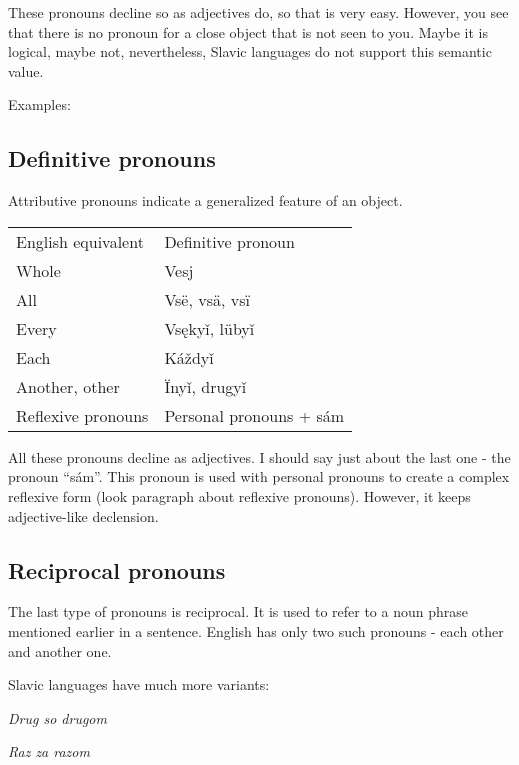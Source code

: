 These pronouns decline so as adjectives do, so that is very easy. However, you see that there is no pronoun for a close object that is not seen to you. Maybe it is logical, maybe not, nevertheless, Slavic languages do not support this semantic value.

Examples:

\subsection{Definitive pronouns}

Attributive pronouns indicate a generalized feature of an object. 

\begin{table}
	\begin{tabular}{ll}
		English equivalent & Definitive pronoun \\
		Whole & Vesj \\
		All & Vsë, vsä, vsï \\
		Every & Vsękyǐ, lübyǐ \\
		Each & Káždyǐ \\
		Another, other & Ïnyǐ, drugyǐ \\
		Reflexive pronouns & Personal pronouns + sám
	\end{tabular}
\end{table}

All these pronouns decline as adjectives. I should say just about the last one - the pronoun “sám”. This pronoun is used with personal pronouns to create a complex reflexive form (look paragraph about reflexive pronouns). However, it keeps adjective-like declension.

\subsection{Reciprocal pronouns}


The last type of pronouns is reciprocal. It is used to refer to a noun phrase mentioned earlier in a sentence. English has only two such pronouns - each other and another one.

Slavic languages have much more variants:

\textit{Drug so drugom}

\textit{Raz za razom}

